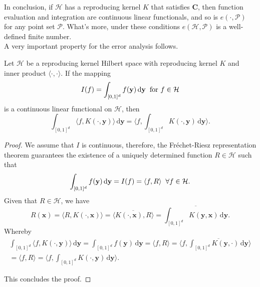 In conclusion, if $\mathcal{H}$ has a reproducing kernel $K$ that satisfies $\textbf{C}$, then function evaluation and integration are continuous linear functionals, and so is $e(\cdot,\mathcal{P})$ for any point set $\mathcal{P}$. What's more, under these conditions $e(\mathcal{H},\mathcal{P})$ is a well-defined finite number.\\

A very important property for the error analysis follows.\\

\begin{Lemma}
    Let $\mathcal{H}$ be a reproducing kernel Hilbert space with reproducing kernel $K$ and inner product $\langle \cdot,\cdot \rangle$. If the mapping
    \begin{equation*}
        I(f) = \int_{[0,1]^d} f(\textbf{y}) \,\mathrm{d}\textbf{y} \hspace{2mm} \text{for } f\in \mathcal{H}
    \end{equation*}
    is a continuous linear functional on $\mathcal{H}$, then
    \begin{equation*}
        \int_{[0,1]^d} \langle f,K(\cdot,\textbf{y}) \rangle \,\mathrm{d}\textbf{y} = \langle f,\int_{[0,1]^d} K(\cdot,\textbf{y}) \,\mathrm{d}\textbf{y} \rangle.
    \end{equation*}
\end{Lemma}
\begin{proof} We assume that $I$ is continuous, therefore, the Fréchet-Riesz representation theorem guarantees the existence of a uniquely determined function $R \in \mathcal{H}$ such that
\begin{equation*}
    \int_{[0,1]^d} f(\textbf{y}) \,\mathrm{d}\textbf{y} = I(f) = \langle f,R \rangle \hspace{2mm} \forall f\in \mathcal{H}.
\end{equation*}
Given that $R\in \mathcal{H}$, we have
\begin{equation*}
    R(\textbf{x}) = \langle R,K(\cdot,\textbf{x}) \rangle = \overline{\langle K(\cdot,\textbf{x}),R \rangle} = \overline{\int_{[0,1]^d} K(\textbf{y},\textbf{x}) \,\mathrm{d}\textbf{y}}.
\end{equation*}
Whereby
\begin{multline*}
    \int_{[0,1]^d} \langle f,K(\cdot,\textbf{y}) \rangle \,\mathrm{d}\textbf{y} = \int_{[0,1]^d} f(\textbf{y}) \,\mathrm{d}\textbf{y} = \langle f,R \rangle = \langle f,\overline{\int_{[0,1]^d} K(\textbf{y},\cdot) \,\mathrm{d}\textbf{y}} \rangle \\
    = \langle f,R \rangle = \langle f,\int_{[0,1]^d} K(\cdot,\textbf{y}) \,\mathrm{d}\textbf{y} \rangle.
\end{multline*}

This concludes the proof.
\end{proof}

